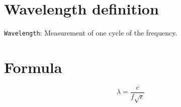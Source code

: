 \documentclass[a4paper, 10pt]{scrartcl}
\begin{document}
\tableofcontents
\newpage

\section{Wavelength definition}

\texttt{Wavelength}: Measurement of one cycle of the frequency.

\section{Formula}

\begin{equation}
\lambda = \frac{c}{f\sqrt{\epsilon}}
\end{equation}
\end{document}
